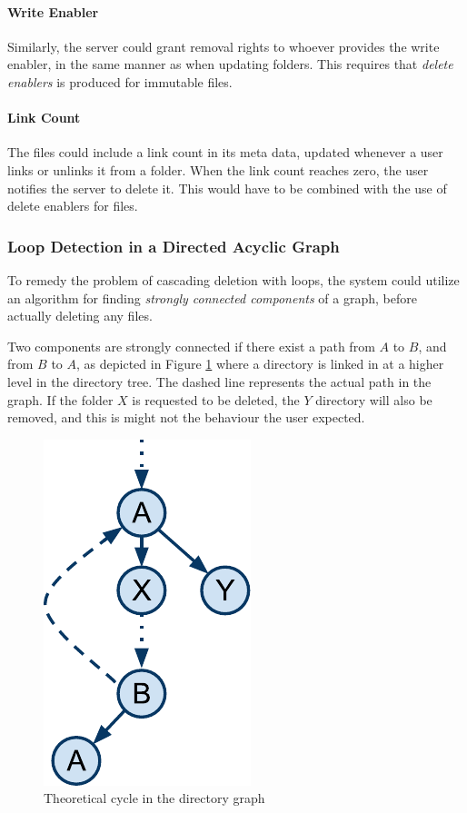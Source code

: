 \documentclass[pdftex,english,10pt,b5paper,twoside]{book}
\begin{document}
\paragraph{Write Enabler} Similarly, the server could grant removal rights to
whoever provides the write enabler, in the same manner as when updating
folders. This requires that \emph{delete enablers} is produced for immutable
files.

\paragraph{Link Count} The files could include a link count in its meta data,
updated whenever a user links or unlinks it from a folder. When the link count
reaches zero, the user notifies the server to delete it. This would have to be
combined with the use of delete enablers for files.

\subsubsection{Loop Detection in a Directed Acyclic Graph}

To remedy the problem of cascading deletion with loops, the system could
utilize an algorithm for finding \emph{strongly connected components} of a
graph, before actually deleting any files.

Two components are strongly connected if there exist a path from $A$ to $B$,
and from $B$ to $A$, as depicted in Figure \ref{fig:DSC:cycles} where a
directory is linked in at a higher level in the directory tree. The dashed line
represents the actual path in the graph. If the folder $X$ is requested to be
deleted, the $Y$ directory will also be removed, and this is might not the
behaviour the user expected.

\begin{figure}[h!]
    \centering
    \includegraphics[scale=0.6]{CyclesintheDAG.pdf}
    \caption{Theoretical cycle in the directory graph}
    \label{fig:DSC:cycles}
\end{figure}
\end{document}
